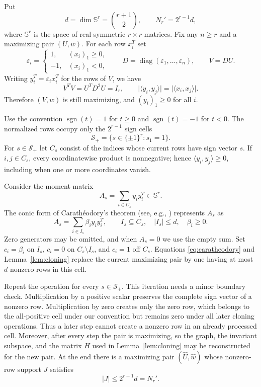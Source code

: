 \documentclass[11pt]{article}
\newcommand{\ip}[2]{\langle #1,#2\rangle}
\begin{document}
Put
\[
 d=\dim\mathbb S^r=\binom{r+1}{2},
 \qquad N_r'=2^{r-1}d,
\]
where $\mathbb S^r$ is the space of real symmetric $r\times r$ matrices.
Fix any $n\ge r$ and a maximizing pair $(U,w)$.  For each row $x_i^T$ set
\[
 \varepsilon_i=\left\{
 \begin{array}{ll}
  1,&(x_i)_1\ge0,\\
  -1,&(x_i)_1<0,
 \end{array}\right.
 \qquad D=\operatorname{diag}(\varepsilon_1,\ldots,\varepsilon_n),
 \qquad V=DU.
\]
Writing $y_i^T=\varepsilon_i x_i^T$ for the rows of $V$, we have
\begin{equation}\label{eq:sign-invariance}
 V^TV=U^TD^2U=I_r,
 \qquad
 \lvert\ip{y_i}{y_j}\rvert=\lvert\ip{x_i}{x_j}\rvert.
\end{equation}
Therefore $(V,w)$ is still maximizing, and $(y_i)_1\ge0$ for all $i$.

Use the convention $\operatorname{sgn}(t)=1$ for $t\ge0$ and
$\operatorname{sgn}(t)=-1$ for $t<0$.  The normalized rows occupy only the
$2^{r-1}$ sign cells
\[
 \mathcal S_+=\{s\in\{\pm1\}^r:s_1=1\}.
\]
For $s\in\mathcal S_+$ let $C_s$ consist of the indices whose current rows
have sign vector $s$.  If $i,j\in C_s$, every coordinatewise product is
nonnegative; hence $\ip{y_i}{y_j}\ge0$, including when one or more
coordinates vanish.

Consider the moment matrix
\[
 A_s=\sum_{i\in C_s}y_iy_i^T\in\mathbb S^r.
\]
The conic form of Carathéodory's theorem (see, e.g.,
\cite[Corollary~7.1i]{Schrijver1986}) represents $A_s$ as
\begin{equation}\label{eq:caratheodory}
 A_s=\sum_{i\in I_s}\beta_i y_iy_i^T,
 \qquad I_s\subseteq C_s,\quad |I_s|\le d,\quad\beta_i\ge0.
\end{equation}
Zero generators may be omitted, and when $A_s=0$ we use the empty sum.
Set $c_i=\beta_i$ on $I_s$, $c_i=0$ on $C_s\setminus I_s$, and
$c_i=1$ off $C_s$.  Equations \eqref{eq:caratheodory} and
Lemma~\ref{lem:cloning} replace the current maximizing pair by one having at
most $d$ nonzero rows in this cell.

Repeat the operation for every $s\in\mathcal S_+$.  This iteration needs a
minor boundary check.  Multiplication by a positive scalar preserves the
complete sign vector of a nonzero row.  Multiplication by zero creates only
the zero row, which belongs to the all-positive cell under our convention
but remains zero under all later cloning operations.  Thus a later step
cannot create a nonzero row in an already processed cell.  Moreover, after
every step the pair is maximizing, so the graph, the invariant subspace, and
the matrix $H$ used in Lemma~\ref{lem:cloning} may be reconstructed for the
new pair.  At the end there is a maximizing pair
$(\widehat U,\widehat w)$ whose nonzero-row support $J$ satisfies
\begin{equation}\label{eq:support}
 |J|\le 2^{r-1}d=N_r'.
\end{equation}
\end{document}
